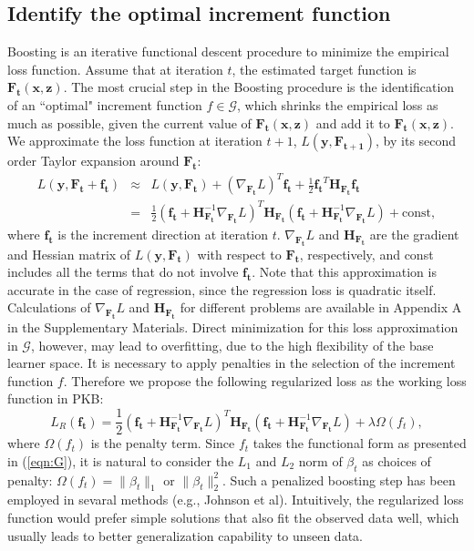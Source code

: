 \documentclass[a4paper,12pt]{article}
\newcommand{\bd}[1]{\mathbf{#1}}
\newcommand{\grad}[2]{\nabla_{\bd{#2}} #1}
\newcommand{\hess}[1]{\bd{H}_{\bd{#1}}}
\begin{document}
	\subsection{Identify the optimal increment function} \label{sec:identify}
	Boosting is an iterative functional descent procedure to minimize the empirical loss function. Assume that at iteration $t$, the estimated target function is $\bd{F_t}(\bd{x}, \bd{z})$. The most crucial step in the Boosting procedure is the identification of an ``optimal" increment function $f \in \mathcal{G}$, which shrinks the empirical loss as much as possible, given the current value of $\bd{F_t}(\bd{x}, \bd{z})$ and add it to $\bd{F_t}(\bd{x}, \bd{z})$. We approximate the loss function at iteration $t+1$, $L(\bd{y},\bd{F_{t+1}})$, by its second order Taylor expansion around $\bd{F_t}$:
	\begin{eqnarray*}
		L(\bd{y}, \bd{F_t} + \bd{f_t}) &\approx& L(\bd{y}, \bd{F_t}) +  (\grad{L}{F_t})^T \bd{f_t} + \frac{1}{2}\bd{f_t}^T \hess{F_t} \bd{f_t} \\
		& = & \frac{1}{2} (\bd{f_t} + \hess{F_t}^{-1} \grad{L}{F_t})^T \hess{F_t} (\bd{f_t} + \hess{F_t}^{-1} \grad{L}{F_t}) + \mbox{const},
	\end{eqnarray*}
where $\bd{f_t}$ is the increment direction at iteration $t$. $\nabla_{\bd{F_t}} L$ and $\bd{H}_{\bd{F_t}}$ are the gradient and Hessian matrix of $L(\bd{y}, \bd{F_t})$ with respect to $\bd{F_t}$, respectively, and const includes all the terms that do not involve $\bd{f_t}$. Note that this approximation is accurate in the case of regression, since the regression loss is quadratic itself. Calculations of $\grad{L}{F_t}$ and $\hess{F_t}$ for different problems are available in Appendix A in the Supplementary Materials. Direct minimization for this loss approximation in $\mathcal{G}$, however, may lead to overfitting, due to the high flexibility of the base learner space. It is necessary to apply penalties in the selection of the increment function  $f$. Therefore we propose the following regularized loss as the working loss function in PKB:
$$L_{R}(\bd{f_t}) = \frac{1}{2} (\bd{f_t} + \hess{F_t}^{-1} \grad{L}{F_t})^T \hess{F_t} (\bd{f_t} + \hess{F_t}^{-1} \grad{L}{F_t}) + \lambda \Omega({f_t}),$$
where $\Omega({f_t})$ is the penalty term. Since ${f_t}$ takes the functional form as presented in (\ref{eqn:G}), it is natural to consider the  $L_1$ and $L_2$ norm of $\beta_t$ as choices of penalty: $\Omega({f_t}) = \| \beta_t \|_1$ or $\| \beta_t \|_2^2$. Such a penalized boosting step has been employed in sevaral methods (e.g., Johnson et al). \cite{johnson2014learning} Intuitively, the regularized loss function would prefer simple solutions that also fit the observed data well, which usually leads to better generalization capability to unseen data.
\end{document}
